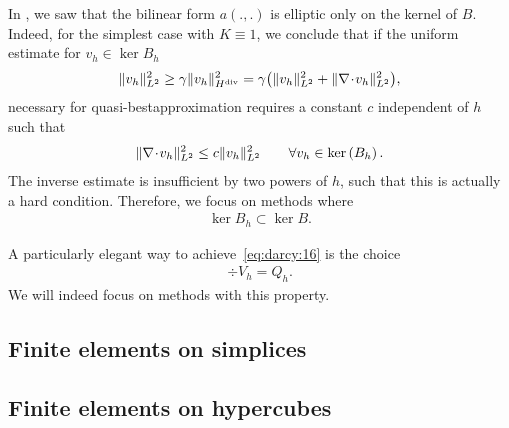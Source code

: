 \begin{intro}
  In , we saw that the
  bilinear form $a(.,.)$ is elliptic only on the kernel of
  $B$. Indeed, for the simplest case with $K\equiv 1$, we conclude
  that if the uniform estimate for $v_h\in \ker{B_h}$
  \begin{gather*}
    \lVert v_h\rVert^2_{L^2}
    \ge \gamma \lVert v_h\rVert^2_{H^{\text{div}}}
    = \gamma \bigl(\lVert v_h\rVert^2_{L^2} + \lVert\nabla\!\cdot\! v_h\rVert^2_{L^2}\bigr),
  \end{gather*}
  necessary for quasi-bestapproximation requires a constant $c$
  independent of $h$ such that
  \begin{gather*}
    \lVert\nabla\!\cdot\! v_h\rVert^2_{L^2} \le c \lVert v_h\rVert^2_{L^2}
    \qquad\forall v_h\in\operatorname{ker}\left(B_h\right).
  \end{gather*}
  The inverse estimate is insufficient by two powers of $h$, such that
  this is actually a hard condition. Therefore, we focus on
  methods where
  \begin{gather}
    \label{eq:darcy:16}
    \ker{B_h} \subset \ker B.
  \end{gather}
\end{intro}

\begin{remark}
  A particularly elegant way to achieve~\eqref{eq:darcy:16} is the
  choice
  \begin{gather}
    \div V_h = Q_h.
  \end{gather}
  We will indeed focus on methods with this property.
\end{remark}



\subsection{Finite elements on simplices}


\subsection{Finite elements on hypercubes}

